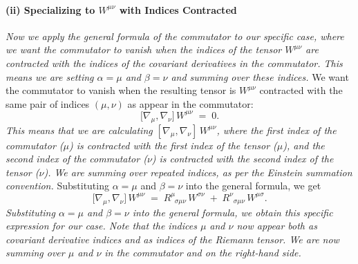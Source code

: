 \paragraph{(ii) Specializing to $W^{\mu\nu}$ with Indices Contracted}
\textit{Now we apply the general formula of the commutator to our specific case, where we want the commutator to vanish when the indices of the tensor \(W^{\mu\nu}\) are contracted with the indices of the covariant derivatives in the commutator. This means we are setting \(\alpha = \mu\) and \(\beta = \nu\) and summing over these indices.}
We want the commutator to vanish when the resulting tensor is $W^{\mu\nu}$ contracted with the same pair of indices $(\mu,\nu)$ as appear in the commutator:
\[
\bigl[\nabla_{\mu}, \nabla_{\nu}\bigr]\,W^{\mu\nu} \;=\; 0.
\]
\textit{This means that we are calculating \([\nabla_{\mu}, \nabla_{\nu}]\,W^{\mu\nu}\), where the first index of the commutator (\(\mu\)) is contracted with the first index of the tensor (\(\mu\)), and the second index of the commutator (\(\nu\)) is contracted with the second index of the tensor (\(\nu\)). We are summing over repeated indices, as per the Einstein summation convention.}
Substituting $\alpha=\mu$ and $\beta=\nu$ into the general formula, we get
\[
\bigl[\nabla_{\mu}, \nabla_{\nu}\bigr]\,W^{\mu\nu}
\;=\;
R^\mu_{\;\;\sigma\mu\nu}\,W^{\sigma\nu}
\;+\;
R^\nu_{\;\;\sigma\mu\nu}\,W^{\mu\sigma}.
\]
\textit{Substituting \(\alpha = \mu\) and \(\beta = \nu\) into the general formula, we obtain this specific expression for our case. Note that the indices \(\mu\) and \(\nu\) now appear both as covariant derivative indices and as indices of the Riemann tensor. We are now summing over \(\mu\) and \(\nu\) in the commutator and on the right-hand side.}

